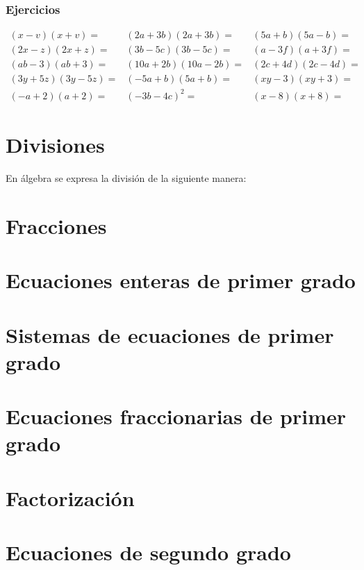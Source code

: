 \subsubsection{Ejercicios}
$$
\begin{array}{l|l|l}
(x-v)(x+v) = & (2a+3b)(2a+3b)= & (5a+b)(5a-b)=\\
(2x-z)(2x+z)= & (3b - 5c)(3b-5c)= & (a-3f)(a+3f)=\\
(ab-3)(ab+3)= & (10a+2b)(10a-2b)=  & (2c+4d)(2c-4d)=\\
(3y+5z)(3y-5z)= & (-5a+b)(5a+b)= & (xy-3)(xy+3)=\\
(-a+2)(a+2)= & (-3b-4c)^2=  & (x-8)(x+8)=
\end{array}
$$

\section{Divisiones}
En álgebra se expresa la división de la siguiente manera:

\section{Fracciones}

\section{Ecuaciones enteras de primer grado}
\section{Sistemas de ecuaciones de primer grado}
\section{Ecuaciones fraccionarias de primer grado}
\section{Factorización}
\section{Ecuaciones de segundo grado}
